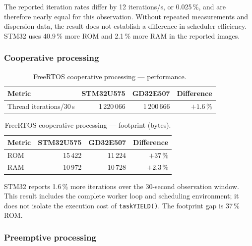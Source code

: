 The reported iteration rates differ by 12 iterations/s, or 0.025\,\%, and are therefore
nearly equal for this observation. Without repeated measurements and dispersion data, the
result does not establish a difference in scheduler efficiency. STM32 uses 40.9\,\% more ROM
and 2.1\,\% more RAM in the reported images.

\subsubsection{Cooperative processing}
\label{sec:gd32-freertos-coop}

\begin{table}[H]
  \centering
  \caption{FreeRTOS cooperative processing --- performance.}
  \label{tab:gd32-freertos-coop-perf}
  \begin{tabular}{l r r r}
    \toprule
    \textbf{Metric} & \textbf{STM32U575} & \textbf{GD32E507} & \textbf{Difference} \\
    \midrule
    Thread iterations/30\,s & 1\,220\,066 & 1\,200\,666 & $+1.6\,\%$ \\
    \bottomrule
  \end{tabular}
\end{table}

\begin{table}[H]
  \centering
  \caption{FreeRTOS cooperative processing --- footprint (bytes).}
  \label{tab:gd32-freertos-coop-fp}
  \begin{tabular}{l r r r}
    \toprule
    \textbf{Metric} & \textbf{STM32U575} & \textbf{GD32E507} & \textbf{Difference} \\
    \midrule
    ROM & 15\,422 & 11\,224 & $+37\,\%$ \\
    RAM & 10\,972 & 10\,728 & $+2.3\,\%$ \\
    \bottomrule
  \end{tabular}
\end{table}

STM32 reports 1.6\,\% more iterations over the 30-second observation window. This result
includes the complete worker loop and scheduling environment; it does not isolate the
execution cost of \texttt{taskYIELD()}. The footprint gap is 37\,\% ROM.

\subsubsection{Preemptive processing}
\label{sec:gd32-freertos-preemptive}

